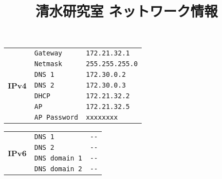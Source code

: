 \documentclass[paper=a4,12pt]{jlreq}
\title{\vspace{-2cm}清水研究室 ネットワーク情報}
\author{}
\date{}
\begin{document}
\maketitle
\begin{tcolorbox}[%
        enhanced,
        colframe = green!20!gray,
        colback = green!10,
        title = {\Large Network},
        fonttitle = \bfseries,
        coltitle = black,
        breakable = true,
        attach boxed title to top left = {xshift = 3mm, yshift = -3mm},
        boxed title style = {colframe = green!20!gray, colback = green!10},
        top = 4mm
    ]
    {\Large
        \begin{tabular}{cp{4cm}p{10cm}}
            \multirow{7}{*}{\textbf{\ttfamily IPv4}} & \verb|Gateway|     & \verb|172.21.32.1|   \\
                                                     & \verb|Netmask|     & \verb|255.255.255.0| \\
                                                     & \verb|DNS 1|       & \verb|172.30.0.2|    \\
                                                     & \verb|DNS 2|       & \verb|172.30.0.3|    \\
                                                     & \verb|DHCP|        & \verb|172.21.32.2|   \\
                                                     & \verb|AP|          & \verb|172.21.32.5|   \\
                                                     & \verb|AP Password| & \verb|xxxxxxxx|
        \end{tabular}
    }
    \tcblower
    {\Large

        \begin{tabular}{cp{4cm}p{10cm}}
            \multirow{4}{*}{\textbf{\ttfamily IPv6}} & \verb|DNS 1|        & \verb|--| \\
                                                     & \verb|DNS 2|        & \verb|--| \\
                                                     & \verb|DNS domain 1| & \verb|--| \\
                                                     & \verb|DNS domain 2| & \verb|--| \\
        \end{tabular}
    }
\end{tcolorbox}
\end{document}
